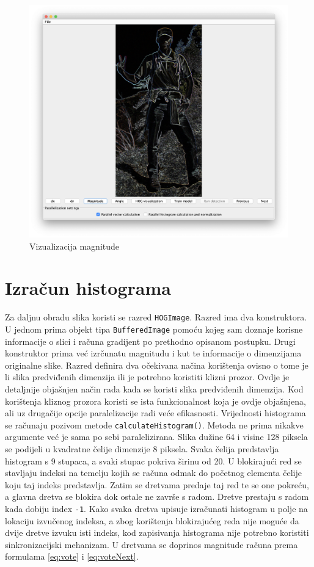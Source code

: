 \documentclass[times, utf8, zavrsni]{fer}
\begin{document}
\begin{figure}[htb]
	\centering
	\includegraphics[width=0.75\linewidth]{figures/magnitude.png}
	\caption{Vizualizacija magnitude}
	\label{fig:magnitude}
\end{figure}

\section{Izračun histograma}
Za daljnu obradu slika koristi se razred \verb|HOGImage|. Razred ima dva konstruktora. U jednom prima objekt tipa \verb|BufferedImage| pomoću kojeg sam doznaje korisne informacije o slici i računa gradijent po prethodno opisanom postupku. Drugi konstruktor prima već izrčunatu magnitudu i kut te informacije o dimenzijama originalne slike. Razred definira dva očekivana načina korištenja ovisno o tome je li slika predviđenih dimenzija ili je potrebno koristiti klizni prozor. Ovdje je detaljnije objašnjen način rada kada se koristi slika predviđenih dimenzija. Kod korištenja kliznog prozora koristi se ista funkcionalnost koja je ovdje objašnjena, ali uz drugačije opcije paralelizacije radi veće efikasnosti. Vrijednosti histograma se računaju pozivom metode \verb|calculateHistogram()|. Metoda ne prima nikakve argumente već je sama po sebi paralelizirana. Slika dužine 64 i visine 128 piksela se podijeli u kvadratne čelije dimenzije 8 piksela. Svaka čelija predstavlja histogram s 9 stupaca, a svaki stupac pokriva širinu od 20\degree. U blokirajući red se stavljaju indeksi na temelju kojih se računa odmak do početnog elementa čelije koju taj indeks predstavlja. Zatim se dretvama predaje taj red te se one pokreću, a glavna dretva se blokira dok ostale ne završe s radom. Dretve prestaju s radom kada dobiju index \verb|-1|. Kako svaka dretva upisuje izračunati histogram u polje na lokaciju izvučenog indeksa, a zbog korištenja blokirajućeg reda nije moguće da dvije dretve izvuku isti indeks, kod zapisivanja histograma nije potrebno koristiti sinkronizacijski mehanizam. U dretvama se doprinos magnitude računa prema formulama \ref{eq:vote} i \ref{eq:voteNext}.
\end{document}
